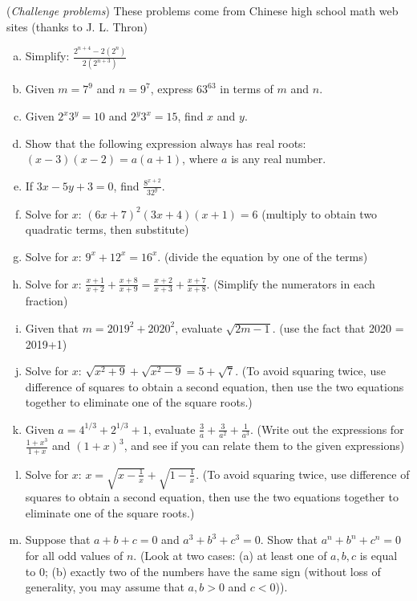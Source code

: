 \begin{exercise}{11}
(\emph{Challenge problems})  These problems come from Chinese high school math web sites (thanks to J. L. Thron)
\begin{enumerate}[(a)]
\item
Simplify: $\frac{2^{n+4} - 2(2^n)}{2(2^{n+3})}$
\item
Given $m = 7^9$ and $n=9^7$, express $63^{63}$ in terms of $m$ and $n$.
\item
Given $2^x3^y = 10$ and $2^y3^x = 15$, find $x$ and $y$.
\item
Show that the following expression always has real roots:  $(x-3)(x-2) = a(a+1)$, where $a$ is any real number.
\item
If $3x-5y+3=0$, find $\displaystyle \frac{8^{x+2}}{32^y}$.
\item
Solve for $x$:  $(6x+7)^2(3x+4)(x+1) = 6$  (multiply to obtain two quadratic terms, then substitute)
\item
Solve for $x$: $9^x + 12^x=16^x$.  (divide the equation by one of the terms)
\item
Solve for $x$:  $\frac{x+1}{x+2} + \frac{x+8}{x+9} =\frac{x+2}{x+3} + \frac{x+7}{x+8}$. (Simplify the numerators in each fraction)
\item
Given that $m=2019^2 + 2020^2$, evaluate $\sqrt{2m-1}$. (use the fact that 2020 = 2019+1)
\item
Solve for $x$: $\sqrt{x^2 + 9} + \sqrt{x^2-9} = 5 + \sqrt{7}$. (To avoid squaring twice, use difference of squares to obtain a second equation, then use the two equations together to eliminate one of the square roots.)
\item
Given $a = 4^{1/3} + 2^{1/3} + 1$, evaluate $\frac{3}{a} + \frac{3}{a^2} + \frac{1}{a^3}$. (Write out the expressions for  
$\frac{1 + x^3}{1+x}$ and $(1+x)^3$, and see if you can relate them to the given expressions)
\item
Solve for $x$: $x = \sqrt{x - \frac{1}{x}} + \sqrt{1 - \frac{1}{x}}$.  (To avoid squaring twice, use difference of squares to obtain a second equation, then use the two equations together to eliminate one of the square roots.)
\item
Suppose that $a+b+c=0$ and $a^3 + b^3 + c^3=0$.  Show that $a^n + b^n + c^n = 0$ for all odd values of $n$. (Look at two cases:  (a) at least one of $a,b,c$ is equal to 0; (b) exactly two of the numbers have the same sign (without loss of generality, you may assume that $a,b>0$ and $c<0$)).

\end{enumerate}
\end{exercise}

